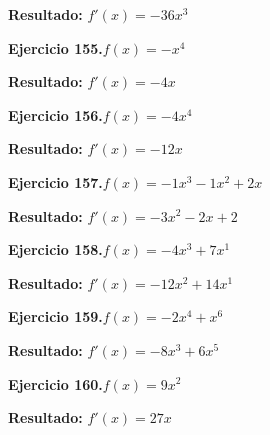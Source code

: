 \documentclass[10pt,a4paper]{article}
\begin{document}
\begin{solbox}
\textbf{Resultado:} \(\displaystyle f'(x) = -36x^{3}\)
\end{solbox}

\begin{ejbox}
\textbf{Ejercicio 155.}\quad $f(x) = -x^{4}$
\end{ejbox}

\begin{solbox}
\textbf{Resultado:} \(\displaystyle f'(x) = -4x\)
\end{solbox}

\begin{ejbox}
\textbf{Ejercicio 156.}\quad $f(x) = -4x^{4}$
\end{ejbox}

\begin{solbox}
\textbf{Resultado:} \(\displaystyle f'(x) = -12x\)
\end{solbox}

\newpage
\begin{ejbox}
\textbf{Ejercicio 157.}\quad $f(x) = -1x^3 -1x^2 +2x$
\end{ejbox}

\begin{solbox}
\textbf{Resultado:} \(\displaystyle f'(x) = -3x^2 -2x +2\)
\end{solbox}

\begin{ejbox}
\textbf{Ejercicio 158.}\quad $f(x) = -4x^{3} + 7x^{1}$
\end{ejbox}

\begin{solbox}
\textbf{Resultado:} \(\displaystyle f'(x) = -12x^{2} + 14x^{1}\)
\end{solbox}

\begin{ejbox}
\textbf{Ejercicio 159.}\quad $f(x) = -2x^{4} + x^{6}$
\end{ejbox}

\begin{solbox}
\textbf{Resultado:} \(\displaystyle f'(x) = -8x^{3} + 6x^{5}\)
\end{solbox}

\newpage
\begin{ejbox}
\textbf{Ejercicio 160.}\quad $f(x) = 9x^{2}$
\end{ejbox}

\begin{solbox}
\textbf{Resultado:} \(\displaystyle f'(x) = 27x\)
\end{solbox}
\end{document}
